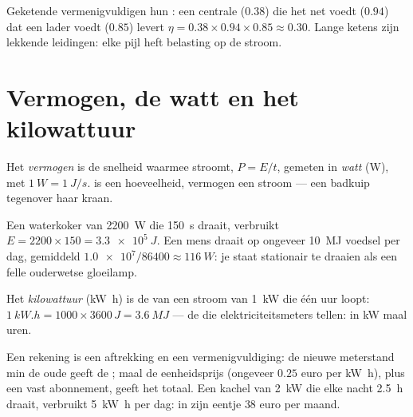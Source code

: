 \begin{remark}\label{rem:g10:energy-conservation:chain-eta}
Geketende  vermenigvuldigen hun : een centrale
($0.38$) die het net voedt ($0.94$) dat een lader voedt ($0.85$) levert
$\eta = 0.38 \times 0.94 \times 0.85 \approx 0.30$. Lange ketens zijn
lekkende leidingen: elke pijl heft belasting op de stroom.
\end{remark}

\section{Vermogen, de watt en het kilowattuur}

\begin{definition}[Vermogen]\label{def:g10:energy-conservation:power}
Het \emph{vermogen} is de snelheid waarmee 
stroomt, $P = E/t$, gemeten in \emph{watt} (\unit{W}), met
$\qty{1}{W} = \qty{1}{J/s}$.  is een hoeveelheid, vermogen een
stroom --- een badkuip tegenover haar kraan.
\end{definition}

\begin{example}\label{ex:g10:energy-conservation:power}
Een waterkoker van \qty{2200}{W} die \qty{150}{s} draait, verbruikt
$E = 2200 \times 150 = \qty{3.3e5}{J}$. Een mens draait op ongeveer
\qty{10}{MJ} voedsel per dag, gemiddeld
$\num{1.0e7}/\num{86400} \approx \qty{116}{W}$: je staat stationair te
draaien als een felle ouderwetse gloeilamp.
\end{example}

\begin{definition}\label{def:g10:energy-conservation:kwh}
Het \emph{kilowattuur} (\unit{kW.h}) is de  van
een stroom van \qty{1}{kW} die één uur loopt:
$\qty{1}{kW.h} = 1000 \times 3600\,\unit{J} = \qty{3.6}{MJ}$ --- de
 die elektriciteitsmeters tellen:  in \unit{kW} maal
uren.
\end{definition}

\begin{example}\label{ex:g10:energy-conservation:bill}
Een rekening is een aftrekking en een vermenigvuldiging: de nieuwe
meterstand min de oude geeft de ; maal de eenheidsprijs
(ongeveer $0.25$ euro per \unit{kW.h}), plus een vast abonnement, geeft
het totaal. Een kachel van \qty{2}{kW} die elke nacht \qty{2.5}{h}
draait, verbruikt \qty{5}{kW.h} per dag: in zijn eentje $38$ euro per
maand.
\end{example}

